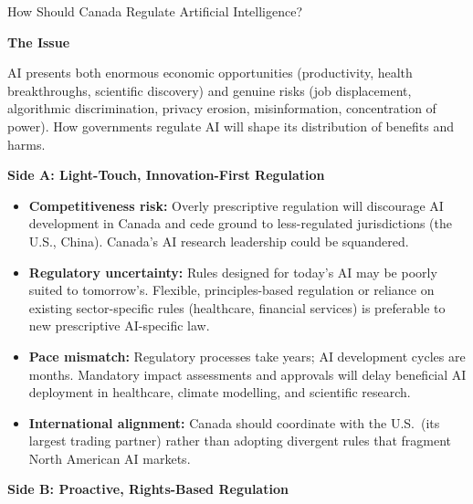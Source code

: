 \begin{policydebate}{How Should Canada Regulate Artificial Intelligence?}

\textbf{The Issue}

AI presents both enormous economic opportunities (productivity, health breakthroughs,
scientific discovery) and genuine risks (job displacement, algorithmic discrimination,
privacy erosion, misinformation, concentration of power). How governments regulate AI
will shape its distribution of benefits and harms.

\vspace{8pt}
\textbf{Side A: Light-Touch, Innovation-First Regulation}

\begin{itemize}
  \item \textbf{Competitiveness risk:} Overly prescriptive regulation will discourage AI development in Canada and cede ground to less-regulated jurisdictions (the U.S., China). Canada's AI research leadership could be squandered.
  \item \textbf{Regulatory uncertainty:} Rules designed for today's AI may be poorly suited to tomorrow's. Flexible, principles-based regulation or reliance on existing sector-specific rules (healthcare, financial services) is preferable to new prescriptive AI-specific law.
  \item \textbf{Pace mismatch:} Regulatory processes take years; AI development cycles are months. Mandatory impact assessments and approvals will delay beneficial AI deployment in healthcare, climate modelling, and scientific research.
  \item \textbf{International alignment:} Canada should coordinate with the U.S.\ (its largest trading partner) rather than adopting divergent rules that fragment North American AI markets.
\end{itemize}

\textbf{Side B: Proactive, Rights-Based Regulation}


\end{policydebate}
